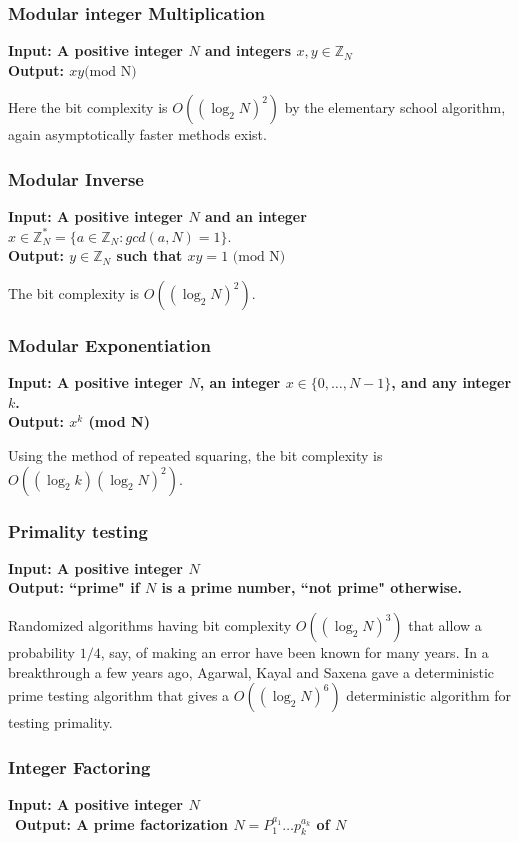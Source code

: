 \subsubsection{Modular integer Multiplication}
\textbf{Input: A positive integer $N$ and integers $x,y \in \mathbb{Z}_N$}\\
\textbf{Output: $xy \text{(mod N)}$}

Here the bit complexity is $O((\log_2 N)^2)$ by the elementary school algorithm, again asymptotically faster methods exist.

\subsubsection{Modular Inverse}
\textbf{Input: A positive integer $N$ and an integer $x \in \mathbb{Z}_N^*=\{a\in\mathbb{Z}_N: gcd(a,N)=1\}$}.\\
\textbf{Output: $y \in \mathbb{Z}_N$ such that $xy=1 \text{ (mod N)}$}

The bit complexity is $O((\log_2 N)^2)$.

\subsubsection{Modular Exponentiation}
\textbf{Input: A positive integer $N$, an integer $x \in \{0,\ldots,N-1\}$, and any integer $k$.}\\
\textbf{Output: $x^k$ (mod N)}

Using the method of repeated squaring, the bit complexity is $O((\log_2 k)(\log_2N)^2)$.

\subsubsection{Primality testing}
\textbf{Input: A positive integer $N$}\\
\textbf{Output: ``prime" if $N$ is a prime number, ``not prime" otherwise.}

Randomized algorithms having bit complexity $O((\log_2 N)^3)$ that allow a probability $1/4$, say, of making an error have been known for many years. In a breakthrough a few years ago, Agarwal, Kayal and Saxena gave a deterministic prime testing algorithm that gives a $O((\log_2 N)^6)$ deterministic algorithm for testing primality.

\subsubsection{Integer Factoring}
\textbf{Input: A positive integer $N$}\\\
\textbf{Output: A prime factorization $N=P_1^{a_1}\ldots p_k^{a_k}$ of $N$}

